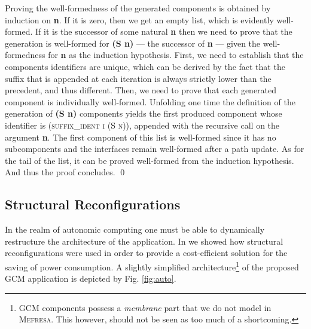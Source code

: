 	\begin{lemma}\label{th:wfgen}
			
	
	Proving the well-formedness of the generated \textsf{component}s is obtained
	by induction on \textbf{n}. If it is zero, then we get an empty list, which is evidently well-formed. 
	If it is the successor of some natural \textbf{n} then we need to prove that
	the generation is well-formed for \textbf{(S n)} --- the successor of \textbf{n} --- given
	the well-formedness for \textbf{n} as the induction hypothesis. First, we need
	to establish that the \textsf{component}s identifiers are unique, which can be derived by the fact
	that the suffix that is appended at each iteration is always strictly lower than the precedent,
	and thus different. Then, we need to prove that each generated \textsf{component} is individually
	well-formed. Unfolding one time the definition of the generation of \textbf{(S n)} 
	\textsf{component}s yields the first produced \textsf{component} whose identifier is
	\textsc{(suffix\_ident i (S n))}, appended with the recursive call on the argument \textbf{n}.
	 The first \textsf{component} of
	this list is well-formed since it has no sub\textsf{component}s and the \textsf{interface}s remain
	well-formed after a \textsf{path} update. As for the tail of the list, it can be proved
	well-formed from the induction hypothesis. And thus the proof concludes. \qed
	\end{lemma}
	
	


\subsection{Structural Reconfigurations}
\label{subsub:reconfig}

	In the realm of autonomic computing one must be able to dynamically
	restructure the architecture of the application. In \cite{BHN:ICAS09} we showed
	how structural reconfigurations were used in order to provide a cost-efficient
	solution for the saving of power consumption. 
	A slightly simplified architecture\footnote{\ac{GCM} \textsf{component}s possess a \textit{membrane} 
	part that we do not model in \textsc{Mefresa}. This however, should not be seen
	as too much of a shortcoming.} of 
	the proposed \ac{GCM} application
	is depicted by Fig. \ref{fig:auto}.


